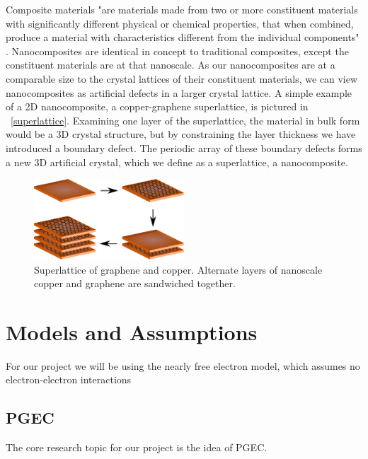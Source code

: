 \documentclass[a4paper,10pt,journal]{IEEEtran}
\newcommand{\figref}[2][\figurename~]{#1\ref{#2}}
\begin{document}
Composite materials "are materials made from two or more constituent
materials with significantly different physical or chemical
properties, that when combined, produce a material with
characteristics different from the individual
components" \cite{wiki-composite}. Nanocomposites are identical in
concept to traditional composites, except the constituent materials
are at that nanoscale. As our nanocomposites are at a comparable size
to the crystal lattices of their constituent materials, we can view
nanocomposites as artificial defects in a larger crystal lattice. A
simple example of a 2D nanocomposite, a copper-graphene superlattice,
is pictured in \figref{superlattice}. Examining one layer of the
superlattice, the material in bulk form would be a 3D crystal structure,
but by constraining the layer thickness we have introduced a boundary
defect. The periodic array of these boundary defects forms a new 3D
artificial crystal, which we define as a superlattice, a nanocomposite.

\begin{figure}
	\centering
	\includegraphics[width=0.5\textwidth]{graphene-superlattice.eps}
	\caption{Superlattice of graphene and copper. Alternate layers of
	nanoscale copper and graphene are sandwiched together.}
\end{figure}

\section{Models and Assumptions}
For our project we will be using the nearly free electron model, which
assumes no electron-electron interactions

\subsection{\acf{PGEC}}
The core research topic for our project is the idea of PGEC.
\end{document}

